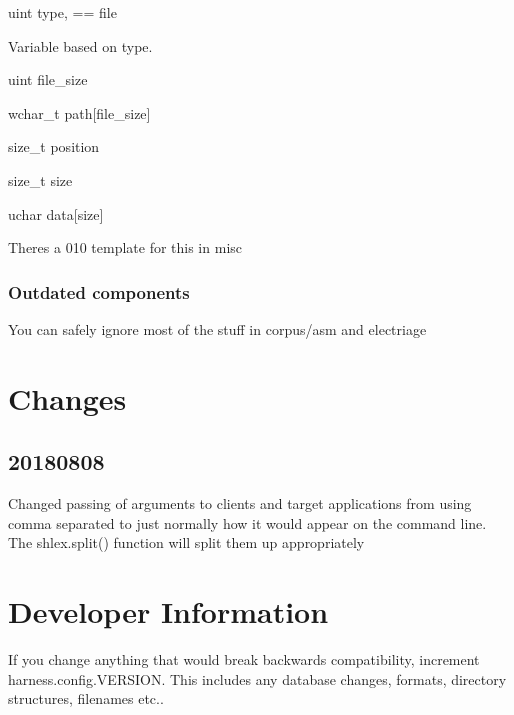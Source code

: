 {\ttfamily uint type}, { == file}

Variable based on type.

{\ttfamily uint file\+\_\+size}

{\ttfamily wchar\+\_\+t path\mbox{[}file\+\_\+size\mbox{]}}

{\ttfamily size\+\_\+t position}

{\ttfamily size\+\_\+t size}

{\ttfamily uchar data\mbox{[}size\mbox{]}}

There\textquotesingle{}s a 010 template for this in {\ttfamily misc}

\subsubsection*{Outdated components}

You can safely ignore most of the stuff in {\ttfamily corpus/asm} and {\ttfamily electriage}

\section*{Changes}

\subsection*{20180808}

Changed passing of arguments to clients and target applications from using comma separated to just normally how it would appear on the command line. The {\ttfamily shlex.\+split()} function will split them up appropriately

\section*{Developer Information}

If you change anything that would break backwards compatibility, increment {\ttfamily harness.\+config.\+V\+E\+R\+S\+I\+ON}. This includes any database changes, formats, directory structures, filenames etc.. 